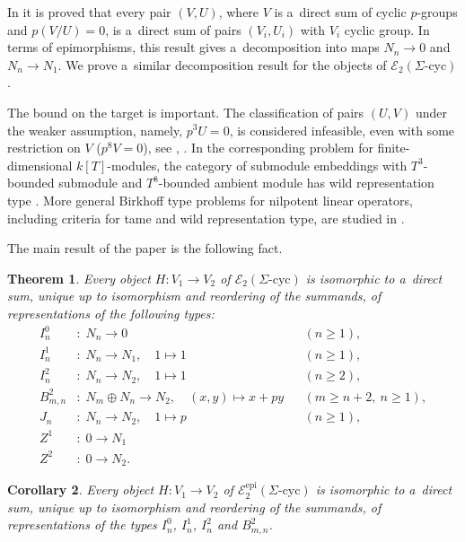 \documentclass[11pt]{article}
\newtheorem{thm}{Theorem}[section]
\newtheorem{cor}[thm]{Corollary}
\theoremstyle{definition}
\begin{document}
In \cite[Theorem~1.1]{kss-SH1} it is proved that every pair $(V,U)$,
where $V$ is a~direct sum of cyclic $p$-groups and $p(V/U)=0$,
is a~direct sum of pairs $(V_i,U_i)$ with $V_i$ cyclic group. In terms of
epimorphisms, this result gives a~decomposition into maps
$N_n\to0$ and $N_n\to N_1$. We prove a~similar decomposition result
for the objects of $\mathcal E_2(\Sigma\text{-cyc})$.

The bound on the target is important. The classification of pairs $(U,V)$ under the weaker assumption, namely, $p^3U=0$, is considered infeasible, even with some restriction on $V$ ($p^8V=0$),  see
\cite[Remark~1.4(3)]{kss-SH1},
\cite{ringel-schmidmeier,schmidmeier-bounded}.
In the corresponding problem for
finite-dimensional $k[T]$-modules, the category of submodule
embeddings with $T^3$-bounded submodule and $T^8$-bounded ambient
module has wild representation type
\cite[Section~3.7]{schmidmeier-bounded}. More general Birkhoff type
problems for nilpotent linear operators, including criteria for
tame and wild representation type, are studied in
\cite{simson-birkhoff}.


The main result of the paper is the following fact.

\begin{thm}\label{thm:main}
	Every object $H:V_1\to V_2$ of
	$\mathcal E_2(\Sigma\text{-cyc})$ is isomorphic to a~direct sum,
	unique up to isomorphism and reordering of the summands, of
	representations of the following types:
	$$
	\begin{aligned}
		I_n^0&:\; N_n\to0
		&& (n\geq1),\\
		I_n^1&:\; N_n\to N_1,\quad 1\mapsto1
		&& (n\geq1),\\
		I_n^2&:\; N_n\to N_2,\quad 1\mapsto1
		&& (n\geq2),\\
		B_{m,n}^2&:\; N_m\oplus N_n\to N_2,\quad (x,y)\mapsto x+py
		&& (m\geq n+2,\ n\geq1),\\
		J_n&:\; N_n\to N_2,\quad 1\mapsto p
		&& (n\geq1),\\
		Z^1&:\; 0\to N_1\\
		Z^2&:\; 0\to N_2.
	\end{aligned}
	$$
\end{thm}

\begin{cor}\label{cor:epi}
	Every object $H:V_1\to V_2$ of
	$\mathcal E_2^{\mathrm{epi}}(\Sigma\text{-cyc})$ is isomorphic to
	a~direct sum, unique up to isomorphism and reordering of the
	summands, of representations of the types
	$I_n^0$, $I_n^1$, $I_n^2$ and $B_{m,n}^2$.
\end{cor}
\end{document}
